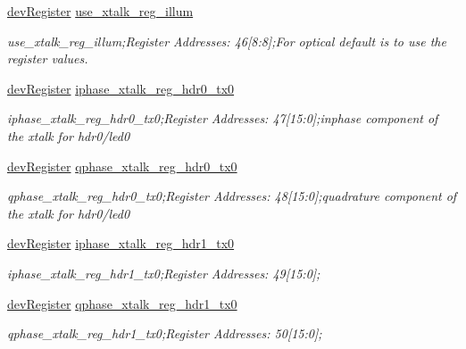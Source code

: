 \begin{DoxyCompactItemize}
\mbox{\hyperlink{classdev_register}{dev\+Register}} \mbox{\hyperlink{class_o_p_t3101_registers_a5fd95ca60881d151fa12abad6d1a18ad}{use\+\_\+xtalk\+\_\+reg\+\_\+illum}}
\begin{DoxyCompactList}\small\item\em use\+\_\+xtalk\+\_\+reg\+\_\+illum;Register Addresses\+: 46\mbox{[}8\+:8\mbox{]};For optical default is to use the register values. \end{DoxyCompactList}\item 
\mbox{\hyperlink{classdev_register}{dev\+Register}} \mbox{\hyperlink{class_o_p_t3101_registers_aa117142d0597c81b487d01279b0a3d3b}{iphase\+\_\+xtalk\+\_\+reg\+\_\+hdr0\+\_\+tx0}}
\begin{DoxyCompactList}\small\item\em iphase\+\_\+xtalk\+\_\+reg\+\_\+hdr0\+\_\+tx0;Register Addresses\+: 47\mbox{[}15\+:0\mbox{]};inphase component of the xtalk for hdr0/led0 \end{DoxyCompactList}\item 
\mbox{\hyperlink{classdev_register}{dev\+Register}} \mbox{\hyperlink{class_o_p_t3101_registers_acaf8a6849e1b0e8166cee03c47cc04cd}{qphase\+\_\+xtalk\+\_\+reg\+\_\+hdr0\+\_\+tx0}}
\begin{DoxyCompactList}\small\item\em qphase\+\_\+xtalk\+\_\+reg\+\_\+hdr0\+\_\+tx0;Register Addresses\+: 48\mbox{[}15\+:0\mbox{]};quadrature component of the xtalk for hdr0/led0 \end{DoxyCompactList}\item 
\mbox{\hyperlink{classdev_register}{dev\+Register}} \mbox{\hyperlink{class_o_p_t3101_registers_a268045eff17e98bf203fb56f8b7807cd}{iphase\+\_\+xtalk\+\_\+reg\+\_\+hdr1\+\_\+tx0}}
\begin{DoxyCompactList}\small\item\em iphase\+\_\+xtalk\+\_\+reg\+\_\+hdr1\+\_\+tx0;Register Addresses\+: 49\mbox{[}15\+:0\mbox{]}; \end{DoxyCompactList}\item 
\mbox{\hyperlink{classdev_register}{dev\+Register}} \mbox{\hyperlink{class_o_p_t3101_registers_a3966bdc6c8c72a7d3357ff575f89f8f0}{qphase\+\_\+xtalk\+\_\+reg\+\_\+hdr1\+\_\+tx0}}
\begin{DoxyCompactList}\small\item\em qphase\+\_\+xtalk\+\_\+reg\+\_\+hdr1\+\_\+tx0;Register Addresses\+: 50\mbox{[}15\+:0\mbox{]}; \end{DoxyCompactList}\item 

\end{DoxyCompactItemize}
